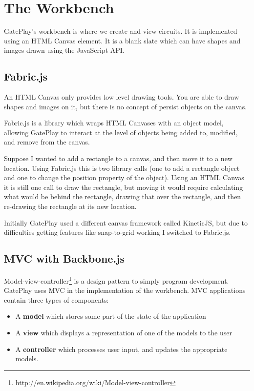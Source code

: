\section{The Workbench}

GatePlay's workbench is where we create and view circuits. It is implemented using an HTML Canvas element. It is a blank slate which can have shapes and images drawn using the JavaScript API.


\subsection{Fabric.js}
An HTML Canvas only provides low level drawing tools. You are able to draw shapes and images on it, but there is no concept of persist objects on the canvas.

Fabric.js is a library which wraps HTML Canvases with an object model, allowing GatePlay to interact at the level of objects being added to, modified, and remove from the canvas. 

Suppose I wanted to add a rectangle to a canvas, and then move it to a new location. Using Fabric.js this is two library calls (one to add a rectangle object and one to change the position property of the object). Using an HTML Canvas it is still one call to draw the rectangle, but moving it would require calculating what would be behind the rectangle, drawing that over the rectangle, and then re-drawing the rectangle at its new location.

Initially GatePlay used a different canvas framework called KineticJS, but due to difficulties getting features like snap-to-grid working I switched to Fabric.js.

\subsection{MVC with Backbone.js}
Model-view-controller\footnote{http://en.wikipedia.org/wiki/Model-view-controller} is a design pattern to simply program development. GatePlay uses MVC in the implementation of the workbench. MVC applications contain three types of components:

\begin{itemize}
	\item A \textbf{model} which stores some part of the state of the application
	\item A \textbf{view} which displays a representation of one of the models to the user
	\item A \textbf{controller} which processes user input, and updates the appropriate models.
\end{itemize}

